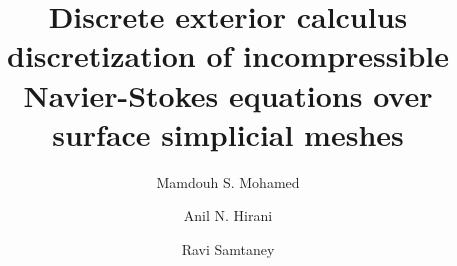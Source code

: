 \documentclass[final,12pt,times]{elsarticle}
\begin{document}
\begin{frontmatter}



\title{Discrete exterior calculus discretization of incompressible Navier-Stokes equations over surface simplicial meshes}


\author[address1]{Mamdouh S. Mohamed}
\author[address2]{Anil N. Hirani}
\author[address1]{Ravi Samtaney}

\address[address1]{Mechanical Engineering, Physical Sciences and Engineering Division, KAUST, Jeddah, KSA}
\address[address2]{Department of Mathematics, University of Illinois at Urbana-Champaign, IL, USA}



\end{frontmatter}
\end{document}
